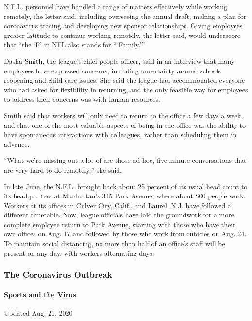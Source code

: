 N.F.L. personnel have handled a range of matters effectively while
working remotely, the letter said, including overseeing the annual
draft, making a plan for coronavirus tracing and developing new sponsor
relationships. Giving employees greater latitude to continue working
remotely, the letter said, would underscore that ``the `F' in NFL also
stands for ```Family.'''

Dasha Smith, the league's chief people officer, said in an interview
that many employees have expressed concerns, including uncertainty
around schools reopening and child care issues. She said the league had
accommodated everyone who had asked for flexibility in returning, and
the only feasible way for employees to address their concerns was with
human resources.

Smith said that workers will only need to return to the office a few
days a week, and that one of the most valuable aspects of being in the
office was the ability to have spontaneous interactions with colleagues,
rather than scheduling them in advance.

``What we're missing out a lot of are those ad hoc, five minute
conversations that are very hard to do remotely,'' she said.

In late June, the N.F.L. brought back about 25 percent of its usual head
count to its headquarters at Manhattan's 345 Park Avenue, where about
800 people work. Workers at its offices in Culver City, Calif., and
Laurel, N.J. have followed a different timetable. Now, league officials
have laid the groundwork for a more complete employee return to Park
Avenue, starting with those who have their own offices on Aug. 17 and
followed by those who work from cubicles on Aug. 24. To maintain social
distancing, no more than half of an office's staff will be present on
any day, with workers alternating days.

\hypertarget{the-coronavirus-outbreak}{%
\subsubsection{The Coronavirus
Outbreak}\label{the-coronavirus-outbreak}}

\hypertarget{sports-and-the-virus}{%
\paragraph{Sports and the Virus}\label{sports-and-the-virus}}

Updated Aug. 21, 2020

